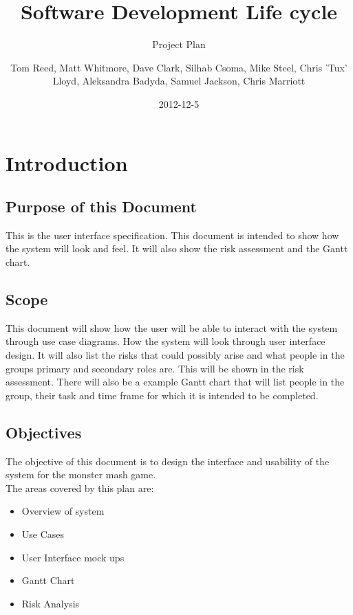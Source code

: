 \documentclass{project}
\begin{document}
\title{Software Development Life cycle}
\subtitle{Project Plan}
\author{Tom Reed, Matt Whitmore, Dave Clark, Silhab Csoma, Mike Steel, Chris 'Tux' Lloyd, Aleksandra Badyda, Samuel Jackson, Chris Marriott}
\date{2012-12-5}
\maketitle
\tableofcontents
\newpage
\section{Introduction}
\subsection{Purpose of this Document}
This is the user interface specification. This document is intended to show how the system will look and feel. It will also show the risk assessment and the Gantt chart.
\subsection{Scope}
This document will show how the user will be able to interact with the system
through use case diagrams. How the system will look through user interface design.
It will also list the risks that could possibly arise and what people in the groups
primary and secondary roles are. This will be shown in the risk assessment. There
will also be a example Gantt chart that will list people in the group, their task and
time frame for which it is intended to be completed.

\subsection{Objectives}
The objective of this document is to design the interface and usability of the system
for the monster mash game.
\\
The areas covered by this plan are:
\begin{itemize}
	\item Overview of system
	\item Use Cases
	\item User Interface mock ups
	\item Gantt Chart
	\item Risk Analysis
\end{itemize}
\end{document}
